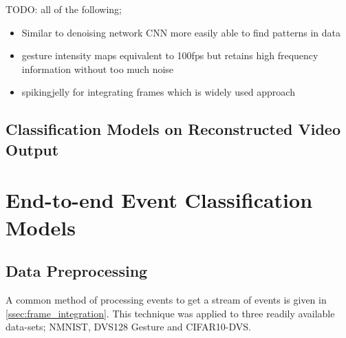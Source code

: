 \color{red} TODO: all of the following;

\begin{itemize}
    \item Similar to denoising network CNN more easily able to find patterns in data
    \item gesture intensity maps equivalent to 100fps but retains high frequency information without too much noise
    \item spikingjelly for integrating frames which is widely used approach
\end{itemize}

\color{black}

\subsection{Classification Models on Reconstructed Video Output}

\section{End-to-end Event Classification Models}

\subsection{Data Preprocessing}

A common method of processing events to get a stream of events is given in \cref{ssec:frame_integration}. This technique was applied to three readily available data-sets; NMNIST, DVS128 Gesture and CIFAR10-DVS.

